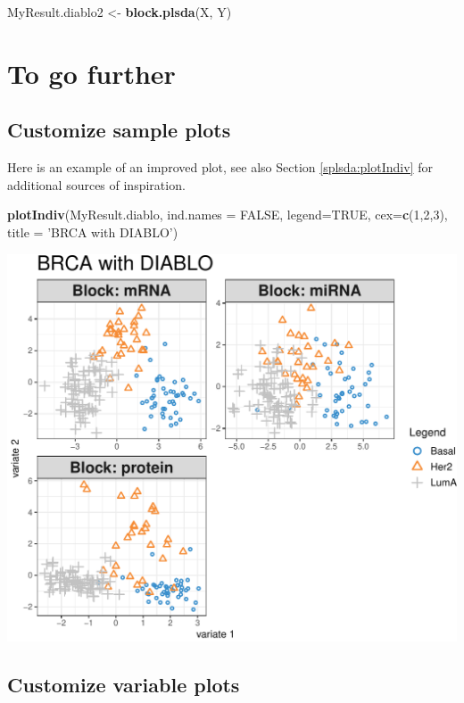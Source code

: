 \documentclass[]{book}
\newenvironment{Shaded}{\begin{snugshade}}{\end{snugshade}}
\newcommand{\DataTypeTok}[1]{\textcolor[rgb]{0.13,0.29,0.53}{#1}}
\newcommand{\DecValTok}[1]{\textcolor[rgb]{0.00,0.00,0.81}{#1}}
\newcommand{\KeywordTok}[1]{\textcolor[rgb]{0.13,0.29,0.53}{\textbf{#1}}}
\newcommand{\NormalTok}[1]{#1}
\newcommand{\OtherTok}[1]{\textcolor[rgb]{0.56,0.35,0.01}{#1}}
\newcommand{\StringTok}[1]{\textcolor[rgb]{0.31,0.60,0.02}{#1}}
\begin{document}
\begin{Shaded}
\begin{Highlighting}[]
\NormalTok{MyResult.diablo2 <-}\StringTok{ }\KeywordTok{block.plsda}\NormalTok{(X, Y)}
\end{Highlighting}
\end{Shaded}

\hypertarget{to-go-further-1}{%
\section{To go further}\label{to-go-further-1}}

\hypertarget{diablo:plotIndiv}{%
\subsection{Customize sample plots}\label{diablo:plotIndiv}}

Here is an example of an improved plot, see also Section \ref{splsda:plotIndiv} for additional sources of inspiration.

\begin{Shaded}
\begin{Highlighting}[]
\KeywordTok{plotIndiv}\NormalTok{(MyResult.diablo, }
          \DataTypeTok{ind.names =} \OtherTok{FALSE}\NormalTok{, }
          \DataTypeTok{legend=}\OtherTok{TRUE}\NormalTok{, }\DataTypeTok{cex=}\KeywordTok{c}\NormalTok{(}\DecValTok{1}\NormalTok{,}\DecValTok{2}\NormalTok{,}\DecValTok{3}\NormalTok{),}
          \DataTypeTok{title =} \StringTok{'BRCA with DIABLO'}\NormalTok{)}
\end{Highlighting}
\end{Shaded}

\begin{center}\includegraphics[width=0.5\linewidth,]{Figures/06-diablo-plotIndiv-1} \end{center}

\hypertarget{diablo:plotVar}{%
\subsection{Customize variable plots}\label{diablo:plotVar}}
\end{document}
